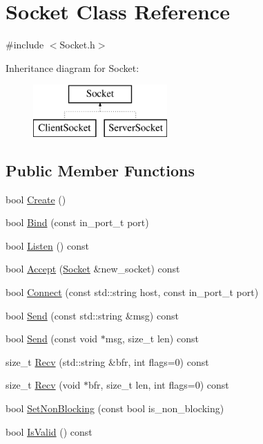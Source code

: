 \hypertarget{class_socket}{}\section{Socket Class Reference}
\label{class_socket}


{\ttfamily \#include $<$Socket.\+h$>$}

Inheritance diagram for Socket\+:\begin{figure}[H]
\begin{center}
\leavevmode
\includegraphics[height=2.000000cm]{class_socket}
\end{center}
\end{figure}
\subsection*{Public Member Functions}
\begin{DoxyCompactItemize}
\item 
bool \hyperlink{class_socket_a8aa4d2a7c1a49186f214d0387c553661}{Create} ()
\item 
bool \hyperlink{class_socket_ae0cf2d7a389fbd76f96517e8db9b2ed9}{Bind} (const in\+\_\+port\+\_\+t port)
\item 
bool \hyperlink{class_socket_ac743519b14d7b964ee85927215fb266d}{Listen} () const 
\item 
bool \hyperlink{class_socket_a8917c07b7c30249cb2347f45a0285793}{Accept} (\hyperlink{class_socket}{Socket} \&new\+\_\+socket) const 
\item 
bool \hyperlink{class_socket_a9561a87ddb6f9014a2dbc95b6326db03}{Connect} (const std\+::string host, const in\+\_\+port\+\_\+t port)
\item 
bool \hyperlink{class_socket_af20012023497dcccdfbce6eb6341a487}{Send} (const std\+::string \&msg) const 
\item 
bool \hyperlink{class_socket_aa57655f2829ba63a44d6b2e026292bd9}{Send} (const void $\ast$msg, size\+\_\+t len) const 
\item 
size\+\_\+t \hyperlink{class_socket_a3f11ff7aecfbe902d5dc0ef6055e04bb}{Recv} (std\+::string \&bfr, int flags=0) const 
\item 
size\+\_\+t \hyperlink{class_socket_ab0220973615a4a87b26e9b34148ccfad}{Recv} (void $\ast$bfr, size\+\_\+t len, int flags=0) const 
\item 
bool \hyperlink{class_socket_a0e3b60b515ad57286079cfd502fa4edd}{Set\+Non\+Blocking} (const bool is\+\_\+non\+\_\+blocking)
\item 
bool \hyperlink{class_socket_af614b429b6f26fa191de2c26fdc188d4}{Is\+Valid} () const 
\end{DoxyCompactItemize}


